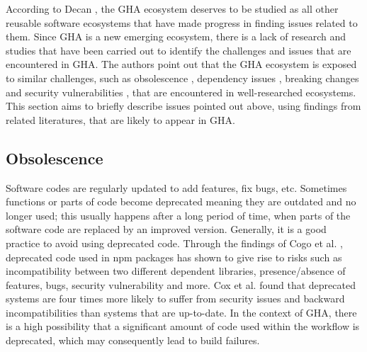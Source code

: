 \documentclass[conference]{IEEEtran}
\begin{document}
	According to Decan \cite{decan2022use}, the GHA ecosystem deserves to be studied as all other reusable software ecosystems that have made progress in finding issues related to them. Since GHA is a new emerging ecosystem, there is a lack of research and studies that have been carried out to identify the challenges and issues that are encountered in GHA. The authors point out that the GHA ecosystem is exposed to similar challenges, such as obsolescence \cite{decan2018evolution} \cite{cogo2021deprecation}, dependency issues \cite{decan2019empirical} \cite{soto2021comprehensive} \cite{decan2019package}, breaking changes \cite{dietrich2019dependency}\cite{decan2018impact} and security vulnerabilities \cite{zimmermann2019small} \cite{kula2018developers}, that are encountered in well-researched ecosystems. This section aims to briefly describe issues pointed out above, using findings from related literatures, that are likely to appear in GHA.


    \subsection{Obsolescence}
        Software codes are regularly updated to add features, fix bugs, etc. Sometimes functions or parts of code become deprecated meaning they are outdated and no longer used; this usually happens after a long period of time, when parts of the software code are replaced by an improved version. Generally, it is a good practice to avoid using deprecated code. Through the findings of Cogo et al. \cite{cogo2021deprecation}, deprecated code used in npm packages has shown to give rise to risks such as incompatibility between two different dependent libraries, presence/absence of features, bugs, security vulnerability and more. Cox et al. \cite{cox2015measuring} found that deprecated systems are four times more likely to suffer from security issues and backward incompatibilities than systems that are up-to-date. In the context of GHA, there is a high possibility that a significant amount of code used within the workflow is deprecated, which may consequently lead to build failures.
\end{document}
